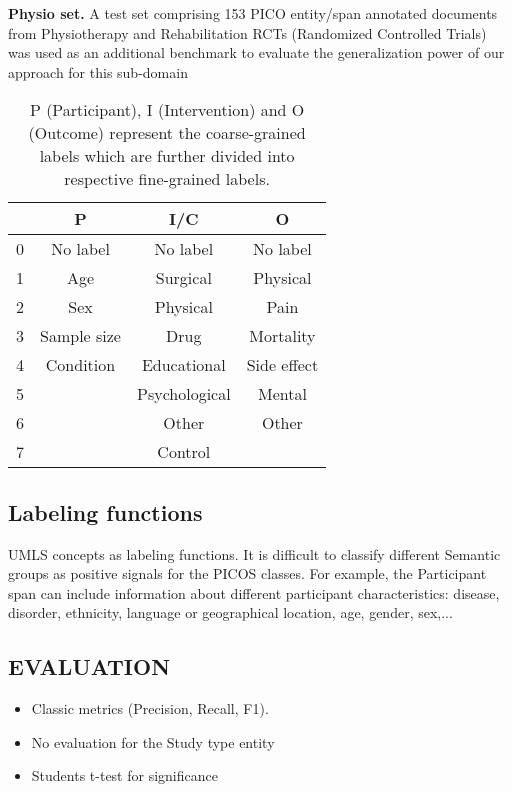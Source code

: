 \documentclass[10.7pt,]{article}
\begin{document}
\textbf{Physio set.} A test set comprising 153 PICO entity/span annotated documents from Physiotherapy and Rehabilitation RCTs (Randomized Controlled Trials) was used as an additional benchmark to evaluate the generalization power of our approach for this sub-domain


\begin{table}[h!]
\begin{center}
\begin{tabular}{| c | c | c | c |} 
\hline
 & P & I/C & O \\ 
\hline
0 & No label & No label & No label \\ 
1 & Age & Surgical & Physical \\ 
2 & Sex & Physical & Pain \\
3 & Sample size & Drug & Mortality \\
4 & Condition & Educational & Side effect \\
5 &  & Psychological & Mental \\
6 &  & Other & Other \\
7 &  & Control &  \\
\hline
\end{tabular}
\caption{P (Participant), I (Intervention) and O (Outcome) represent the coarse-grained labels which are further divided into respective fine-grained labels.}
\label{table:coarsefineconcept}
\end{center}
\end{table}


%
%
%
\subsection{Labeling functions}\label{lfs}
%
UMLS concepts as labeling functions. It is difficult to classify different Semantic groups as positive signals for the PICOS classes. For example, the Participant span can include information about different participant characteristics: disease, disorder, ethnicity, language or geographical location, age, gender, sex,... 
%
%
%
\subsection{EVALUATION}\label{eval}
%
\begin{itemize}
    \item Classic metrics (Precision, Recall, F1).
    \item No evaluation for the Study type entity
    \item Students t-test for significance
\end{itemize}
%
%
%
\end{document}
